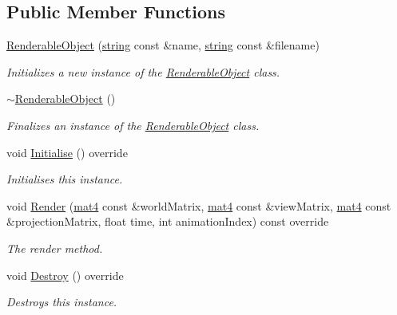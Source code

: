 \subsection*{Public Member Functions}
\begin{DoxyCompactItemize}
\item 
\hyperlink{class_renderable_object_aa5a1c2891015026ea222d88d0b445941}{Renderable\+Object} (\hyperlink{_types_8h_ad453f9f71ce1f9153fb748d6bb25e454}{string} const \&name, \hyperlink{_types_8h_ad453f9f71ce1f9153fb748d6bb25e454}{string} const \&filename)
\begin{DoxyCompactList}\small\item\em Initializes a new instance of the \hyperlink{class_renderable_object}{Renderable\+Object} class. \end{DoxyCompactList}\item 
\hyperlink{class_renderable_object_a2867647b8c67efb8c5e744c2baaf23dc}{$\sim$\+Renderable\+Object} ()
\begin{DoxyCompactList}\small\item\em Finalizes an instance of the \hyperlink{class_renderable_object}{Renderable\+Object} class. \end{DoxyCompactList}\item 
void \hyperlink{class_renderable_object_a82c94dda816b7b43ff74714c7e91b92d}{Initialise} () override
\begin{DoxyCompactList}\small\item\em Initialises this instance. \end{DoxyCompactList}\item 
void \hyperlink{class_renderable_object_a5e56c1423e5c59a2b8858645b5b7936d}{Render} (\hyperlink{_types_8h_a2db59f395fe82a7394c6324956c265d8}{mat4} const \&world\+Matrix, \hyperlink{_types_8h_a2db59f395fe82a7394c6324956c265d8}{mat4} const \&view\+Matrix, \hyperlink{_types_8h_a2db59f395fe82a7394c6324956c265d8}{mat4} const \&projection\+Matrix, float time, int animation\+Index) const  override
\begin{DoxyCompactList}\small\item\em The render method. \end{DoxyCompactList}\item 
void \hyperlink{class_renderable_object_abf03a9d657815d24fbf0e49d3a80a5a4}{Destroy} () override
\begin{DoxyCompactList}\small\item\em Destroys this instance. \end{DoxyCompactList}\item 

\end{DoxyCompactItemize}
